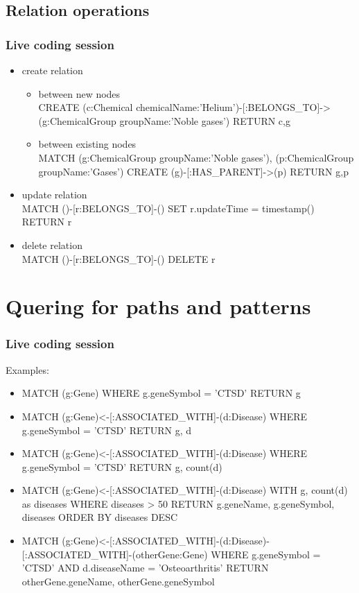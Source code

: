 \documentclass[12pt]{beamer}
\begin{document}
    \subsection{Relation operations}
    \begin{frame}
        \frametitle{Live coding session}
        \begin{itemize}
            \item create relation\\
            \begin{itemize}
                \item between new nodes\\
                CREATE (c:Chemical {chemicalName:'Helium'})-[:BELONGS\_TO]->(g:ChemicalGroup {groupName:'Noble gases'}) RETURN c,g
                \item between existing nodes\\
                MATCH (g:ChemicalGroup {groupName:'Noble gases'}), (p:ChemicalGroup {groupName:'Gases'})
                CREATE (g)-[:HAS\_PARENT]->(p) RETURN g,p
            \end{itemize}
            \item update relation\\
            MATCH ()-[r:BELONGS\_TO]-() SET r.updateTime = timestamp() RETURN r\\
            \item delete relation\\
            MATCH ()-[r:BELONGS\_TO]-() DELETE r
        \end{itemize}
    \end{frame}
    
    \section{Quering for paths and patterns}
    \begin{frame}
        \frametitle{Live coding session}
        Examples:
        \begin{itemize}
            \item MATCH (g:Gene) WHERE g.geneSymbol = 'CTSD' RETURN g
            \item MATCH (g:Gene)<-[:ASSOCIATED\_WITH]-(d:Disease) WHERE g.geneSymbol = 'CTSD' RETURN g, d
            \item MATCH (g:Gene)<-[:ASSOCIATED\_WITH]-(d:Disease) WHERE g.geneSymbol = 'CTSD' RETURN g, count(d)
            \item MATCH (g:Gene)<-[:ASSOCIATED\_WITH]-(d:Disease) WITH g, count(d) as diseases WHERE diseases > 50 RETURN g.geneName, g.geneSymbol, diseases ORDER BY diseases DESC\\
            \item MATCH (g:Gene)<-[:ASSOCIATED\_WITH]-(d:Disease)-[:ASSOCIATED\_WITH]-(otherGene:Gene) WHERE g.geneSymbol = 'CTSD' AND d.diseaseName = 'Osteoarthritis' RETURN otherGene.geneName, otherGene.geneSymbol
        \end{itemize}
    \end{frame}
    
\end{document}
